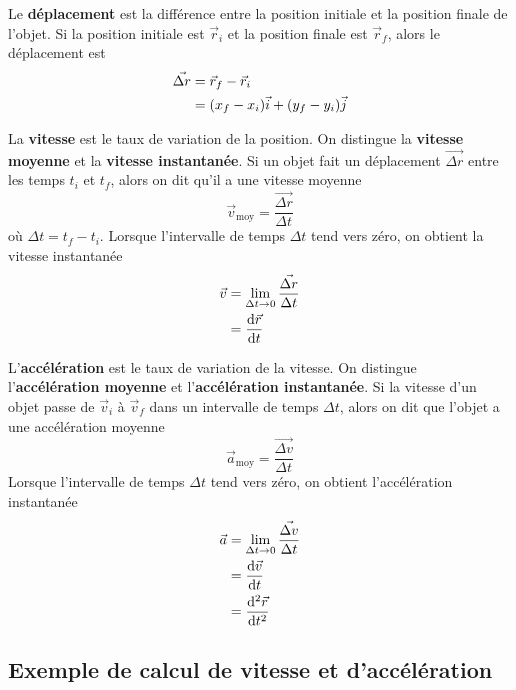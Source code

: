 Le \textbf{déplacement} est la différence entre la position initiale et la
position finale de l'objet.  Si la position initiale est $\vec{r}_i$ et la
position finale est $\vec{r}_f$, alors le déplacement est
\begin{align*}
  \vec{\Delta r} &= \vec{r}_f - \vec{r}_i \\
                 &= (x_f - x_i) \vec{i} + (y_f - y_i) \vec{j}
\end{align*}

La \textbf{vitesse} est le taux de variation de la position.  On distingue la
\textbf{vitesse moyenne} et la \textbf{vitesse instantanée}.  Si un objet fait
un déplacement $\vec{\Delta r}$ entre les temps $t_i$ et $t_f$, alors on dit qu'il a
une vitesse moyenne
\[
  \vec{v}_{\mathrm{moy}} = \frac{\vec{\Delta r}}{\Delta t} 
\]
où $\Delta t = t_f - t_i$.  Lorsque l'intervalle de temps $\Delta t$ tend vers
zéro, on obtient la vitesse instantanée
\begin{align*}
  \vec{v} &= \lim_{\Delta t \rightarrow 0} \frac{\vec{\Delta r}}{\Delta t} \\
          &= \frac{\mathrm{d}\vec{r}}{\mathrm{d}t}
\end{align*}

L'\textbf{accélération} est le taux de variation de la vitesse.  On distingue
l'\textbf{accélération moyenne} et l'\textbf{accélération instantanée}.  Si la
vitesse d'un objet passe de $\vec{v}_i$ à $\vec{v}_f$ dans un intervalle de
temps $\Delta t$, alors on dit que l'objet a une accélération moyenne
\[
  \vec{a}_{\mathrm{moy}} = \frac{\vec{\Delta v}}{\Delta t} 
\]
Lorsque l'intervalle de temps $\Delta t$ tend vers zéro, on obtient
l'accélération instantanée
\begin{align*}
  \vec{a} &= \lim_{\Delta t \rightarrow 0} \frac{\vec{\Delta v}}{\Delta t} \\
          &= \frac{\mathrm{d}\vec{v}}{\mathrm{d}t} \\
          &= \frac{\mathrm{d}{}^2\vec{r}}{\mathrm{d}t^2}
\end{align*}


\subsection{Exemple de calcul de vitesse et d'accélération}

